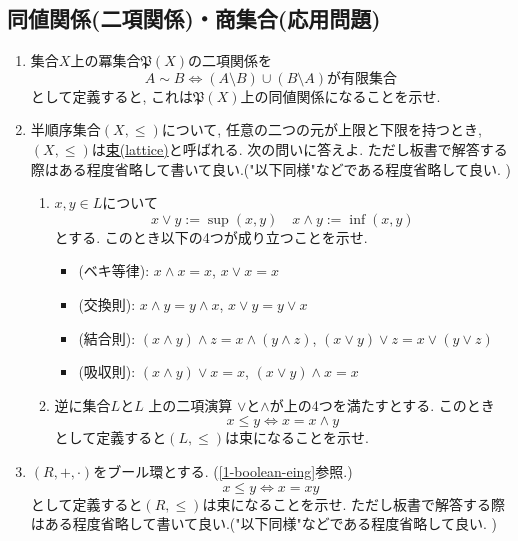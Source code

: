 \documentclass[dvipdfmx,a4paper,11pt]{article}
\theoremstyle{definition}
\begin{document}
 \newpage

 \begin{center}
\section{同値関係(二項関係)・商集合(応用問題)}
\label{sec-6}
\end{center}

  \begin{enumerate}[label=\textbf{問}\ref*{sec-6}.\arabic*]
 \item \label{4-bin} 集合$X$上の冪集合$\mathfrak{P}(X)$の二項関係を
 $$
 A \sim B \Longleftrightarrow
 \text{$(A \setminus B) \cup (B \setminus A)$が有限集合}
 $$
 として定義すると, これは$\mathfrak{P}(X)$上の同値関係になることを示せ. 
 \item  半順序集合$(X, \le)$について, 任意の二つの元が上限と下限を持つとき, $(X, \le)$は\underline{束(lattice)}と呼ばれる.
 次の問いに答えよ. ただし板書で解答する際はある程度省略して書いて良い.("以下同様"などである程度省略して良い. )
    \begin{enumerate}[label=(\arabic*).]
 \setlength{\parskip}{0cm}
  \setlength{\itemsep}{0pt}
  \item $x, y \in L$について
  $$
  x \vee y := \sup(x, y) \quad
  x \wedge y := \inf(x,y)
  $$
  とする. このとき以下の4つが成り立つことを示せ. 
\begin{itemize}
 \setlength{\parskip}{0cm}
  \setlength{\itemsep}{0pt}
     \item (ベキ等律): $x \wedge x =x$, $x \vee x =x$
    \item (交換則): \( x \wedge y = y \wedge x \), \( x \vee y = y \vee x \)
    \item (結合則): \( (x \wedge y) \wedge z = x \wedge (y \wedge z) \), \( (x \vee y) \vee z = x \vee (y \vee z) \)
    \item (吸収則): \( (x \wedge y) \vee x = x \), \( (x \vee y) \wedge x = x \)
\end{itemize}
\item  逆に集合$L$と\( L \) 上の二項演算 \( \vee \)と\( \wedge \)が上の4つを満たすとする. 
 このとき
 $$
 x \le y \Longleftrightarrow  x = x \wedge y
 $$
 として定義すると$(L, \le)$は束になることを示せ. 
  \end{enumerate}
  
 \item $(R, +, \cdot)$をブール環とする. (\ref{1-boolean-eing}参照.)
 $$
  x \le y \Longleftrightarrow  x = xy
 $$
 として定義すると$(R, \le)$は束になることを示せ. ただし板書で解答する際はある程度省略して書いて良い.("以下同様"などである程度省略して良い. )
 

\end{enumerate}
\end{document}
